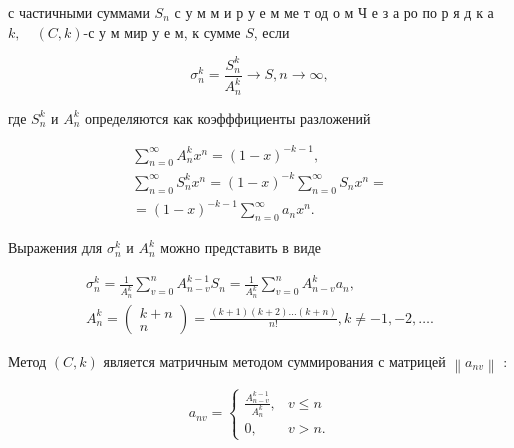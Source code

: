 \documentclass[10pt]{article}
\begin{document}
с частичными суммами $S_{n}$ с у м м и р у е м ме т од о м Ч е з а ро по р я д к а $k, \quad(C, k)$-с у м мир у е м, к сумме $S$, если



\[

\sigma_{n}^{k}=\frac{S_{n}^{k}}{A_{n}^{k}} \rightarrow S, n \rightarrow \infty,

\]



где $S_{n}^{k}$ и $A_{n}^{k}$ определяются как коэфффициенты разложений



\[

\begin{gathered}

\sum_{n=0}^{\infty} A_{n}^{k} x^{n}=(1-x)^{-k-1}, \\

\sum_{n=0}^{\infty} S_{n}^{k} x^{n}=(1-x)^{-k} \sum_{n=0}^{\infty} S_{n} x^{n}= \\

=(1-x)^{-k-1} \sum_{n=0}^{\infty} a_{n} x^{n} .

\end{gathered}

\]



Выражения для $\sigma_{n}^{k}$ и $A_{n}^{k}$ можно представить в виде



\[

\begin{gathered}

\sigma_{n}^{k}=\frac{1}{A_{n}^{k}} \sum_{v=0}^{n} A_{n-v}^{k-1} S_{n}=\frac{1}{A_{n}^{k}} \sum_{v=0}^{n} A_{n-v}^{k} a_{n}, \\

A_{n}^{k}=\left(\begin{array}{c}

k+n \\

n

\end{array}\right)=\frac{(k+1)(k+2) \ldots(k+n)}{n !}, k \neq-1,-2, \ldots .

\end{gathered}

\]



Метод $(C, k)$ является матричным методом суммирования с матрицей $\left\|a_{n v}\right\|$ :



\[

a_{n v}=\left\{\begin{array}{cl}

\frac{A_{n-v}^{k-1}}{A_{n}^{k}}, & v \leqslant n \\

0, & v>n .

\end{array}\right.

\]
\end{document}

